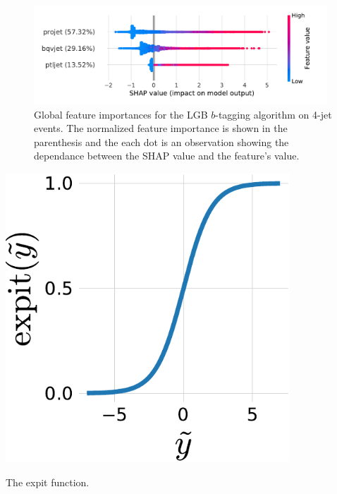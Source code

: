 \begin{figure}[h!]
  \centerfloat
  \includegraphics[width=0.98\textwidth, trim=10 10 20 10, clip]{figures/quarks/shap_global-down_sample=1.00-ML_vars=vertex-selection=b-ejet_min=4-n_iter_RS_lgb=99-n_iter_RS_xgb=9-cdot_cut=0.90-version=19-njet=4.pdf}
  \caption[Global Feature Importances for the LGB $b$-Tagging Algorithm on 4-Jet Events]
          {Global feature importances for the LGB $b$-tagging algorithm on 4-jet events. The normalized feature importance is shown in the parenthesis and the each dot is an observation showing the dependance between the SHAP value and the feature's value. 
          } 
  \label{fig:q:shap_btag_global_4j}
\end{figure}

\begin{marginfigure}[3cm]
  \centerfloat
  \includegraphics[width=0.8\textwidth]{figures/logit_expit/expit.pdf}
  \caption[The expit Function]
          {The expit function.} 
  \label{fig:q:expit}
\end{marginfigure}

